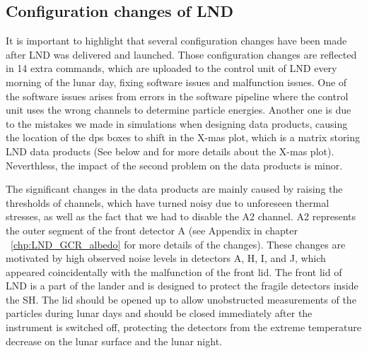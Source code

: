 
\subsection*{Configuration changes of LND}
\label{sec:configuration_changes}
It is important to highlight that several configuration changes have been made after \ac{LND} was delivered and launched. Those configuration changes are reflected in 14 extra commands, which are uploaded to the control unit of \ac{LND} every morning of the lunar day, fixing software issues and malfunction issues. One of the software issues arises from errors in the software pipeline where the control unit uses the wrong channels to determine particle energies. Another one is due to the mistakes we made in simulations when designing data products, causing the location of the \ac{dps} boxes to shift in the X-mas plot, which is a matrix storing \ac{LND} data products (See below and \citet{Wimmer2020SSRv} for more details about the X-mas plot). Neverthless, the impact of the second problem on the data products is minor. 

The significant changes in the data products are mainly caused by raising the thresholds of channels, which have turned noisy due to unforeseen thermal stresses, as well as the fact that we had to disable the A2 channel. A2 represents the outer segment of the front detector A (see Appendix in chapter ~\ref{chp:LND_GCR_albedo} for more details of the changes). These changes are motivated by high observed noise levels in detectors A, H, I, and J, which appeared coincidentally with the malfunction of the front lid. The front lid of \ac{LND} is a part of the lander and is designed to protect the fragile detectors inside the \ac{SH}. The lid should be opened up to allow unobstructed measurements of the particles during lunar days and should be closed immediately after the instrument is switched off, protecting the detectors from the extreme temperature decrease on the lunar surface and the lunar night. 

